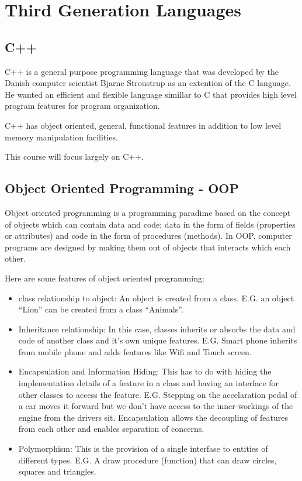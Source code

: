 \documentclass{book}
\begin{document}
\chapter{Third Generation Languages}

\section{C++}
C++ is a general purpose programming language that was developed by the Danish computer scientist Bjarne Stroustrup as an extention of the C language. He wanted an efficient and flexible language simillar to C that provides high level program features for program organization.

C++ has object oriented, general, functional features in addition to low level memory manipulation facilities.

This course will focus largely on C++.

\section{Object Oriented Programming {-} OOP}
Object oriented programming is a programming paradime based on the concept of objects which can contain data and code; data in the form of fields (properties or attributes) and code in the form of procedures (methods). In OOP, computer programs are designed by making them out of objects that interacts which each other.

Here are some features of object oriented programming:

\begin{itemize}
	\item class relationship to object: An object is created from a class. E.G. an object ``Lion'' can be created from a class ``Animals''.
	\item Inheritance relationship: In this case, classes inherits or absorbs the data and code of another class and it's own unique features. E.G. Smart phone inherits from mobile phone and adds features like Wifi and Touch screen.
	\item Encapsulation and Information Hiding: This has to do with hiding the implementation details of a feature in a class and having an interface for other classes to access the feature. E.G. Stepping on the accelaration pedal of a car moves it forward but we don't have access to the inner-workings of the engine from the drivers sit. Encapsulation allows the decoupling of features from each other and enables separation of concerns.
	\item Polymorphism: This is the provision of a single interfase to entities of different types. E.G. A draw procedure (function) that can draw circles, squares and triangles.
\end{itemize}
\end{document}
